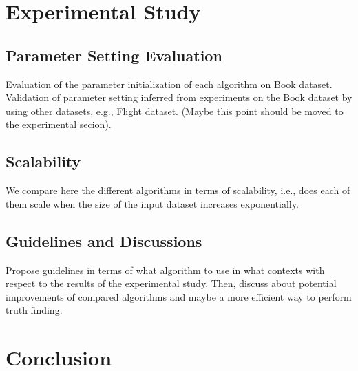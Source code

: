 \documentclass{vldb}
\begin{document}
\section{Experimental Study}

\subsection{Parameter Setting Evaluation}
Evaluation of the parameter initialization of each algorithm on Book dataset.
Validation of parameter setting inferred from experiments on the Book
dataset by using other datasets, e.g., Flight dataset. (Maybe this point should
be moved to the experimental secion).

\subsection{Scalability}
We compare here the different algorithms in terms of scalability, i.e., does each
of them scale when the size of the input dataset increases exponentially.

\subsection{Guidelines and Discussions}
Propose guidelines in terms of what algorithm to use in what contexts with respect to 
the results of the experimental study. Then, discuss about potential improvements of 
compared algorithms and maybe a more efficient way to perform truth finding.


\section{Conclusion}
\end{document}
